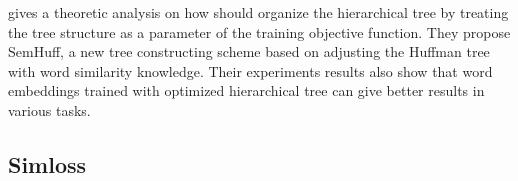 \documentclass[twoside]{article}
\theoremstyle{definition}
\DeclareMathOperator{\E}{\mathbb E}
\DeclareMathOperator*{\argmin}{arg\,min}
\newcommand{\loss}{\ell}
\newcommand{\x}{\mathbf x}
\newcommand{\lF}[1]{{\lVert {#1} \rVert}_F}
\newcommand{\fixme}[1]{\noindent{\color{red}\textbf{FIXME:}  {#1}}}
\begin{document}
\cite{Yang2017OptimizeHS} gives a theoretic analysis on how should organize the hierarchical tree by treating the tree structure as a parameter of the training objective function.
They propose SemHuff, a new tree constructing scheme based on adjusting the Huffman tree with word similarity knowledge.
Their experiments results also show that word embeddings trained with optimized hierarchical tree can give better results in various tasks.


%

\subsection{Simloss}

\end{document}
